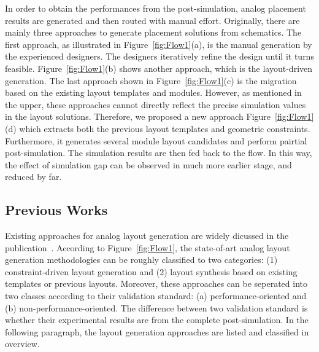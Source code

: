 In order to obtain the performances from the post-simulation, analog placement results are generated and then routed with manual effort. Originally, there are mainly three approaches to generate placement solutions from schematics. The first approach, as illustrated in Figure~\ref{fig:Flow1}(a), is the manual generation by the experienced designers. The designers iteratively refine the design until it turns feasible. Figure~\ref{fig:Flow1}(b) shows another approach, which is the layout-driven generation. The last approach shown in Figure~\ref{fig:Flow1}(c) is the migration based on the existing layout templates and modules. However, as mentioned in the upper, these approaches cannot directly reflect the 
precise simulation values in the layout solutions. Therefore, we proposed a new approach Figure~\ref{fig:Flow1}(d) which extracts both the previous layout templates and geometric constraints. Furthermore, it generates several module layout candidates and perform pairtial post-simulation. The simulation results are then fed back to the flow. In this way, the effect of simulation gap can be observed in much more earlier stage, and reduced by far. 

\subsection{Previous Works}

Existing approaches for analog layout generation are widely dicussed in the publication~\cite{Mark_ASPDAC16}. According to Figure~\ref{fig:Flow1}, the state-of-art analog layout generation methodologies can be roughly classified to two categories: (1) constraint-driven layout generation and (2) layout synthesis based on existing templates or previous layouts. Moreover, these approaches can be seperated into two classes according to their validation standard: (a) performance-oriented and (b) non-performance-oriented. The difference between two validation standard is whether their experimental results are from the complete post-simulation. In the following paragraph, the layout generation approaches are listed and classified in overview.

